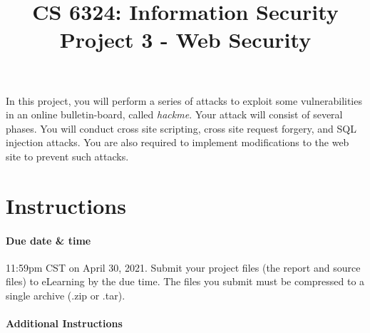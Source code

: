 \documentclass[]{article}
\title{CS 6324: Information Security \\\textbf{Project 3 - Web Security}}
\date{}
\begin{document}
\ifpdf
{}
\else
{}
\fi

\maketitle

In this project, you will perform a series of attacks to exploit some vulnerabilities in an online bulletin-board, called \emph{hackme}. Your attack will consist of several phases. You will conduct cross site scripting, cross site request forgery, and SQL injection attacks. You are also required to implement modifications to the web site to prevent such attacks.
\ \\

\section*{Instructions}

\paragraph{Due date \& time} 11:59pm CST on April 30, 2021.
Submit your project files (the report and source files) to eLearning by the due time.
The files you submit must be compressed to a single archive (.zip or .tar).

\paragraph{Additional Instructions}
\end{document}
